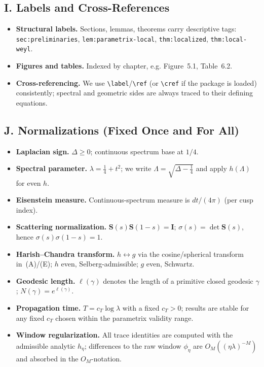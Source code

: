 \subsection*{I. Labels and Cross-References}

\begin{itemize}
  \item \textbf{Structural labels.} Sections, lemmas, theorems carry descriptive tags:
        \texttt{sec:preliminaries}, \texttt{lem:parametrix-local}, \texttt{thm:localized}, \texttt{thm:local-weyl}.
  \item \textbf{Figures and tables.} Indexed by chapter, e.g. Figure~5.1, Table~6.2.
  \item \textbf{Cross-referencing.} We use \verb|\label|/\verb|\ref| (or \verb|\cref| if the package is loaded) consistently; spectral and geometric sides are always traced to their defining equations.
\end{itemize}

\subsection*{J. Normalizations (Fixed Once and For All)}

\begin{itemize}
  \item \textbf{Laplacian sign.} $\Delta\ge 0$; continuous spectrum base at $1/4$.
  \item \textbf{Spectral parameter.} $\lambda=\tfrac{1}{4}+t^2$; we write $\Lambda=\sqrt{\Delta-\tfrac14}$ and apply $h(\Lambda)$ for even $h$.
  \item \textbf{Eisenstein measure.} Continuous-spectrum measure is $dt/(4\pi)$ (per cusp index).
  \item \textbf{Scattering normalization.} $\mathbf{S}(s)\mathbf{S}(1-s)=\mathbf{I}$; $\sigma(s)=\det\mathbf{S}(s)$, hence $\sigma(s)\sigma(1-s)=1$.
  \item \textbf{Harish--Chandra transform.} $h\leftrightarrow g$ via the cosine/spherical transform in~(A)/(E); $h$ even, Selberg-admissible; $g$ even, Schwartz.
  \item \textbf{Geodesic length.} $\ell(\gamma)$ denotes the length of a primitive closed geodesic $\gamma$; $N(\gamma)=e^{\ell(\gamma)}$.
  \item \textbf{Propagation time.} $T=c_T\log\lambda$ with a fixed $c_T>0$; results are stable for any fixed $c_T$ chosen within the parametrix validity range.
  \item \textbf{Window regularization.} All trace identities are computed with the admissible analytic $h_\eta$; differences to the raw window $\phi_\eta$ are $O_M((\eta\lambda)^{-M})$ and absorbed in the $O_M$-notation.
\end{itemize}

